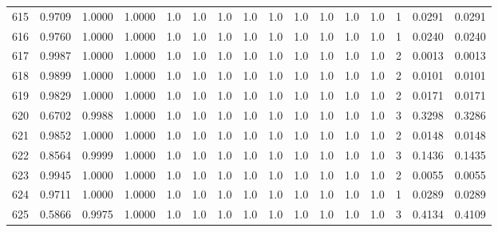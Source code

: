 \begin{tabular}{lrrrrrrrrrrrrrrr}
615 &      0.9709 &  1.0000 &  1.0000 &     1.0 &     1.0 &     1.0 &     1.0 &     1.0 &     1.0 &     1.0 &      1.0 &        1.0 &      1 &                    0.0291 &                     0.0291 \\
616 &      0.9760 &  1.0000 &  1.0000 &     1.0 &     1.0 &     1.0 &     1.0 &     1.0 &     1.0 &     1.0 &      1.0 &        1.0 &      1 &                    0.0240 &                     0.0240 \\
617 &      0.9987 &  1.0000 &  1.0000 &     1.0 &     1.0 &     1.0 &     1.0 &     1.0 &     1.0 &     1.0 &      1.0 &        1.0 &      2 &                    0.0013 &                     0.0013 \\
618 &      0.9899 &  1.0000 &  1.0000 &     1.0 &     1.0 &     1.0 &     1.0 &     1.0 &     1.0 &     1.0 &      1.0 &        1.0 &      2 &                    0.0101 &                     0.0101 \\
619 &      0.9829 &  1.0000 &  1.0000 &     1.0 &     1.0 &     1.0 &     1.0 &     1.0 &     1.0 &     1.0 &      1.0 &        1.0 &      2 &                    0.0171 &                     0.0171 \\
620 &      0.6702 &  0.9988 &  1.0000 &     1.0 &     1.0 &     1.0 &     1.0 &     1.0 &     1.0 &     1.0 &      1.0 &        1.0 &      3 &                    0.3298 &                     0.3286 \\
621 &      0.9852 &  1.0000 &  1.0000 &     1.0 &     1.0 &     1.0 &     1.0 &     1.0 &     1.0 &     1.0 &      1.0 &        1.0 &      2 &                    0.0148 &                     0.0148 \\
622 &      0.8564 &  0.9999 &  1.0000 &     1.0 &     1.0 &     1.0 &     1.0 &     1.0 &     1.0 &     1.0 &      1.0 &        1.0 &      3 &                    0.1436 &                     0.1435 \\
623 &      0.9945 &  1.0000 &  1.0000 &     1.0 &     1.0 &     1.0 &     1.0 &     1.0 &     1.0 &     1.0 &      1.0 &        1.0 &      2 &                    0.0055 &                     0.0055 \\
624 &      0.9711 &  1.0000 &  1.0000 &     1.0 &     1.0 &     1.0 &     1.0 &     1.0 &     1.0 &     1.0 &      1.0 &        1.0 &      1 &                    0.0289 &                     0.0289 \\
625 &      0.5866 &  0.9975 &  1.0000 &     1.0 &     1.0 &     1.0 &     1.0 &     1.0 &     1.0 &     1.0 &      1.0 &        1.0 &      3 &                    0.4134 &                     0.4109 \\

\end{tabular}
